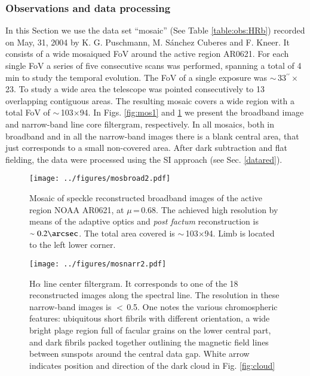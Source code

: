 \subsubsection*{Observations and data processing}
In this Section we use the data set ``mosaic'' (See Table \ref{table:obs:HRb}) recorded on May, 31, 2004 by K. G. Puschmann, M. S\'anchez Cuberes and F. Kneer. It consists of a wide mosaiqued FoV around the active region AR0621. For each single FoV a series of five consecutive scans was performed, spanning a total of 4 min to study the temporal evolution. The FoV of a single exposure was $\sim$\,33$^{\prime \prime}\times$23\arcsec. To study a wide area the telescope was pointed consecutively to 13 overlapping contiguous areas. The resulting mosaic covers a wide region with a total FoV of $\sim$\,103\arcsec$\times$94\arcsec. In Figs. \ref{fig:mos1} and \ref{fig:mos2} we present the broadband image and narrow-band line core filtergram, respectively. In all mosaics, both in broadband and in all the narrow-band images there is a blank central area, that just corresponds to a small non-covered area. After dark subtraction and flat fielding, the data were processed using the SI approach (see Sec. \ref{datared}).

\begin{figure}
\centering
\texttt{[image: ../figures/mosbroad2.pdf]}
\caption{Mosaic of speckle reconstructed broadband images of the active region NOAA AR0621, at $\mu$\,=\,0.68. The achieved high resolution by means of the adaptive optics and {\em post factum} reconstruction is $\sim0.2\arcsec$. The total area covered is $\sim$\,103\arcsec$\times$94\arcsec. Limb is located to the left lower corner.}
\label{fig:mos1}
\centering
\texttt{[image: ../figures/mosnarr2.pdf]}
\caption{H$\alpha$ line center filtergram. It corresponds to one of the 18 reconstructed images along the spectral line. The resolution in these narrow-band images is $<$\,0.5\arcsec. One notes the various chromospheric features: ubiquitous short fibrils with different orientation, a wide bright plage region full of facular grains on the lower central part, and dark fibrils packed together outlining the magnetic field lines between sunspots around the central data gap. White arrow indicates position and direction of the dark cloud in Fig. \ref{fig:cloud}}
\label{fig:mos2}
\end{figure}

